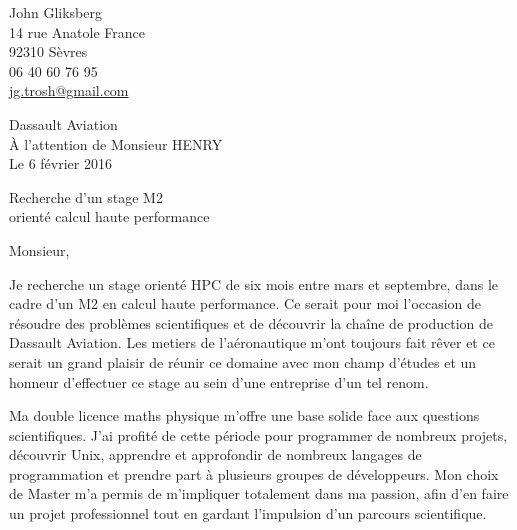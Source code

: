 \documentclass[12pt,a4paper]{article}
\begin{document}
\begin{minipage}{.5\textwidth}
\begin{flushleft}
John Gliksberg \\
14 rue Anatole France \\
92310 Sèvres \\
06 40 60 76 95 \\
\href{mailto:jg.trosh@gmail.com}
{jg.trosh@gmail.com}
\end{flushleft}
\end{minipage}

{
    \hspace*{\fill}
    \begin{minipage}{.5\textwidth}
    \begin{flushleft}
        Dassault Aviation \\
        \`A l’attention de Monsieur HENRY \\[.07in]
    Le 6 février 2016
    \end{flushleft}
    \end{minipage}
}

\vspace*{\fill}

\begin{center}
    \large
    Recherche d'un stage M2 \\
    orienté calcul haute performance
\end{center}

\vspace*{\fill}

Monsieur,

Je recherche un stage orienté HPC de six mois entre mars et septembre,
dans le cadre d'un M2 en calcul haute performance.
Ce serait pour moi l'occasion de résoudre des problèmes scientifiques
et de découvrir la chaîne de production de Dassault Aviation.
Les metiers de l’aéronautique m’ont toujours fait rêver et
ce serait un grand plaisir de réunir ce domaine avec mon
champ d’études et un honneur d’effectuer ce stage au sein
d’une entreprise d’un tel renom.

Ma double licence maths physique m'offre
une base solide face aux questions scientifiques.
J'ai profité de cette période pour programmer de nombreux projets,
découvrir Unix, apprendre et approfondir de nombreux langages de programmation
et prendre part à plusieurs groupes de développeurs.
Mon choix de Master m'a permis de m'impliquer totalement dans ma passion,
afin d'en faire un projet professionnel tout en gardant
l'impulsion d'un parcours scientifique.
\end{document}
